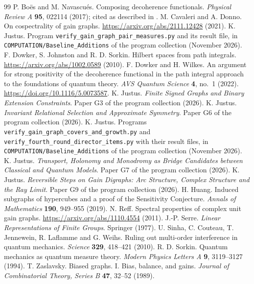 \documentclass[11pt,a4paper]{article}
\begin{document}
\begin{thebibliography}{99}
 P. Bo\"es and M. Navascu\'es. Composing decoherence functionals. \emph{Physical Review A} \textbf{95}, 022114 (2017); cited as described in \cite{dw}.
 M. Cavaleri and A. Donno. On cospectrality of gain graphs. \url{https://arxiv.org/abs/2111.12428} (2021).
 K. Justus. Program \texttt{verify\_gain\_graph\_pair\_measures.py} and its result file, in \texttt{COMPUTATION/Baseline\_Additions} of the program collection (November 2026).
 F. Dowker, S. Johnston and R. D. Sorkin. Hilbert spaces from path integrals. \url{https://arxiv.org/abs/1002.0589} (2010).
 F. Dowker and H. Wilkes. An argument for strong positivity of the decoherence functional in the path integral approach to the foundations of quantum theory. \emph{AVS Quantum Science} \textbf{4}, no.~1 (2022). \url{https://doi.org/10.1116/5.0073587}.
 K. Justus. \emph{Finite Signed Graphs and Binary Extension Constraints}. Paper G3 of the program collection (2026).
 K. Justus. \emph{Invariant Relational Selection and Approximate Symmetry}. Paper G6 of the program collection (2026).
 K. Justus. Programs \texttt{verify\_gain\_graph\_covers\_and\_growth.py} and \texttt{verify\_fourth\_round\_director\_items.py} with their result files, in \texttt{COMPUTATION/Baseline\_Additions} of the program collection (November 2026).
 K. Justus. \emph{Transport, Holonomy and Monodromy as Bridge Candidates between Classical and Quantum Models}. Paper G7 of the program collection (2026).
 K. Justus. \emph{Reversible Steps on Gain Digraphs: Arc Structure, Complex Structure and the Ray Limit}. Paper G9 of the program collection (2026).
 H. Huang. Induced subgraphs of hypercubes and a proof of the Sensitivity Conjecture. \emph{Annals of Mathematics} \textbf{190}, 949--955 (2019).
 N. Reff. Spectral properties of complex unit gain graphs. \url{https://arxiv.org/abs/1110.4554} (2011).
 J.-P. Serre. \emph{Linear Representations of Finite Groups}. Springer (1977).
 U. Sinha, C. Couteau, T. Jennewein, R. Laflamme and G. Weihs. Ruling out multi-order interference in quantum mechanics. \emph{Science} \textbf{329}, 418--421 (2010).
 R. D. Sorkin. Quantum mechanics as quantum measure theory. \emph{Modern Physics Letters A} \textbf{9}, 3119--3127 (1994).
 T. Zaslavsky. Biased graphs. I. Bias, balance, and gains. \emph{Journal of Combinatorial Theory, Series B} \textbf{47}, 32--52 (1989).
\end{thebibliography}
\end{document}
